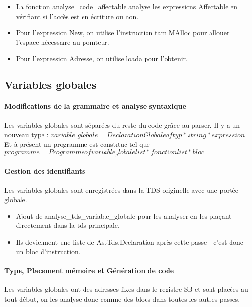 \documentclass[a4paper,12pt]{article}
\begin{document}
\begin{itemize}
\item La fonction analyse\_code\_affectable analyse les expressions Affectable en vérifiant si l'accès est en écriture ou non.

\item Pour l'expression New, on utilise l'instruction tam MAlloc pour allouer l'espace nécessaire au pointeur.

\item Pour l'expression Adresse, on utilise loada pour l'obtenir.

\end{itemize}

\subsection{Variables globales}
\paragraph{Modifications de la grammaire et analyse syntaxique}
Les variables globales sont séparées du reste du code grâce au parser. Il y a un nouveau type : $variable\_globale = DeclarationGlobale of typ * string * expression$
Et à présent un programme est constitué tel que $programme =  Programme of variable_globale list * fonction list * bloc$

\paragraph{Gestion des identifiants}
Les variables globales sont enregistrées dans la TDS originelle avec une portée globale.
\begin{itemize}
\item Ajout de analyse\_tds\_variable\_globale pour les analyser en les plaçant directement dans la tds principale.
\item Ils deviennent une liste de AstTds.Declaration après cette passe - c'est donc un bloc d'instruction.
\end{itemize}

\paragraph{Type, Placement mémoire et Génération de code}
Les variables globales ont des adresses fixes dans le registre SB et sont placées au tout début, on les analyse donc comme des blocs dans toutes les autres passes.
\end{document}
